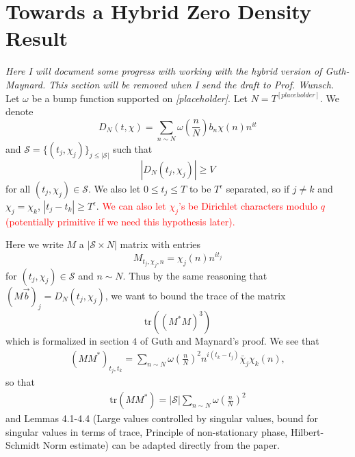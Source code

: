 \section{Towards a Hybrid Zero Density Result}

\textit{Here I will document some progress with working with
the hybrid version of Guth-Maynard. This section will be removed when I send the draft to Prof. Wunsch.}
Let $\omega$ be a bump function supported on \textit{[placeholder]}. Let $N=T^{[placeholder]}$. We denote \[
D_N(t,\chi) = \sum_{n\sim N} \omega\left(\frac{n}{N}\right)b_n \chi(n) n^{it}
\]
and $\mathcal{S}=\{(t_j,\chi_j)\}_{j\leq |\mathcal{S}|}$ such that 
\[
    |D_N(t_j,\chi_j)|\geq V
\]
for all $(t_j,\chi_j)\in\mathcal{S}$.
We also let $0\leq t_j\leq T$ to be $T^\epsilon$ separated, so if 
$j\neq k$ and $\chi_j=\chi_k$, $|t_j-t_k|\geq T^\epsilon$. \textcolor{red}{We can also
let $\chi_j$'s be Dirichlet characters modulo $q$ (potentially primitive if we need this hypothesis later).}

Here we write $M$ a $|\mathcal{S}\times N|$ matrix with entries
\[
    M_{t_j,\chi_j,n} = \chi_j(n)n^{it_j}
\]
for $(t_j,\chi_j)\in\mathcal{S}$ and $n\sim N$.
Thus by the same reasoning that $(M\vec{b})_j=D_N(t_j,\chi_j)$,
we want to bound the trace of the matrix \[
\textrm{tr}((M^*M)^3)
\]
which is formalized in section $4$ of Guth and Maynard's proof.
We see that \begin{align*}
    (MM^*)_{t_j,t_k} = \sum_{n\sim N} \omega\left(\frac{n}{N}\right)^2 n^{i(t_k-t_j)}\bar{\chi}_j\chi_k(n),
\end{align*}
so that \begin{align*}
    \textrm{tr}(MM^*) = |\mathcal{S}|\sum_{n\sim N} \omega\left(\frac{n}{N}\right)^2
\end{align*}
and Lemmas 4.1-4.4 (Large values controlled by singular values, bound for singular values in terms of trace,
Principle of non-stationary phase, Hilbert-Schmidt Norm estimate) can be adapted directly from the paper.

